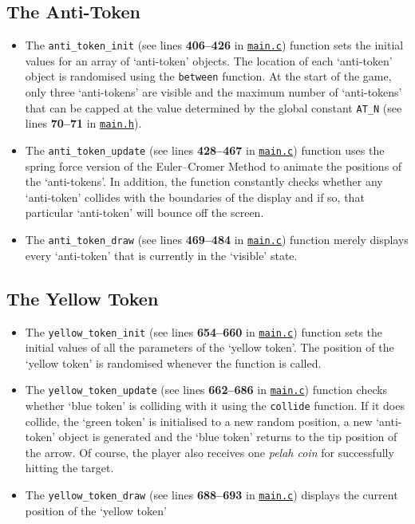 \documentclass[11pt]{article}
\newcommand{\lineref}[1]{lines \textbf{#1}}
\begin{document}
\subsection{The Anti-Token}

\begin{itemize}
    \item The \texttt{anti\_token\_init} (see \lineref{406--426} in \hyperref[app:main-c]{\texttt{main.c}}) function sets the initial values for an array of `anti-token' objects. The location of each `anti-token' object is randomised using the \texttt{between} function. At the start of the game, only three `anti-tokens' are visible and the maximum number of `anti-tokens' that can be capped at the value determined by the global constant \texttt{AT\_N} (see \lineref{70--71} in \hyperref[app:main-h]{\texttt{main.h}}). 
    \item The \texttt{anti\_token\_update} (see \lineref{428--467} in \hyperref[app:main-c]{\texttt{main.c}}) function uses the spring force version of the Euler--Cromer Method to animate the positions of the `anti-tokens'. In addition, the function constantly checks whether any `anti-token' collides with the boundaries of the display and if so, that particular `anti-token' will bounce off the screen. 
    \item The \texttt{anti\_token\_draw} (see \lineref{469--484} in \hyperref[app:main-c]{\texttt{main.c}}) function merely displays every `anti-token' that is currently in the `visible' state. 
\end{itemize}
 

\subsection{The Yellow Token}

\begin{itemize}
    \item The \texttt{yellow\_token\_init} (see \lineref{654--660} in \hyperref[app:main-c]{\texttt{main.c}}) function sets the initial values of all the parameters of the `yellow token'. The position of the `yellow token' is randomised whenever the function is called. 
    \item The \texttt{yellow\_token\_update} (see \lineref{662--686} in \hyperref[app:main-c]{\texttt{main.c}}) function checks whether `blue token' is colliding with it using the \texttt{collide} function. If it does collide, the `green token' is initialised to a new random position, a new `anti-token' object is generated and the `blue token' returns to the tip position of the arrow. Of course, the player also receives one \textit{pelah coin} for successfully hitting the target.
    \item The \texttt{yellow\_token\_draw} (see \lineref{688--693} in \hyperref[app:main-c]{\texttt{main.c}}) displays the current position of the `yellow token'
\end{itemize}
\end{document}
